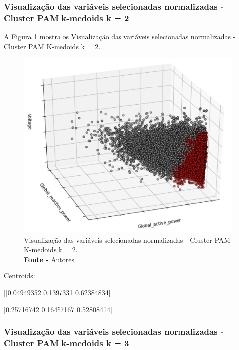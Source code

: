 \subsubsection{Visualização das variáveis selecionadas normalizadas - Cluster PAM k-medoids k = 2}

A Figura \ref{fig: Visualização das variáveis selecionadas normalizadas - Cluster PAM K-medoids k = 2} mostra os Visualização das variáveis selecionadas normalizadas - Cluster PAM K-medoids k = 2.
\begin{figure}[H]
    \centering
    \includegraphics[width=0.99\textwidth]{Figuras/4. Resultados e Discussões/Exer4/Visualização das variáveis selecionadas normalizadas - Cluster PAM K-medoids k = 2.jpg}
    \caption{Visualização das variáveis selecionadas normalizadas - Cluster PAM K-medoids k = 2.\\ \textbf{Fonte -} Autores}
    \label{fig: Visualização das variáveis selecionadas normalizadas - Cluster PAM K-medoids k = 2}
\end{figure}
 
Centroids: 

[[0.04949352 0.1397331  0.62384834]

[0.25716742 0.16457167 0.52808414]]
 
\subsubsection{Visualização das variáveis selecionadas normalizadas - Cluster PAM k-medoids k = 3}
 
